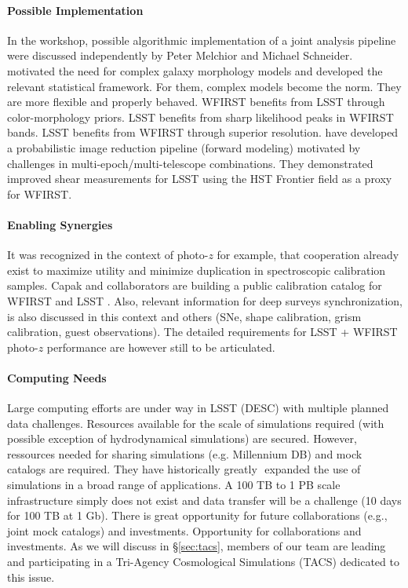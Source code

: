 \paragraph*{Possible Implementation} In the workshop, possible algorithmic
implementation of a joint analysis pipeline were discussed independently by
Peter Melchior and Michael Schneider. \citet{Melchior:2016asy} motivated the
need for complex galaxy morphology models and developed the relevant statistical
framework. For them, complex models become the norm. They are more flexible and properly
behaved. WFIRST benefits from LSST through color-morphology priors. LSST
benefits from sharp likelihood peaks in WFIRST bands. LSST benefits from WFIRST
through superior resolution. \citet{Schneider:2014rha} have developed a probabilistic
image reduction pipeline (forward modeling) motivated by challenges in
multi-epoch/multi-telescope combinations. They demonstrated improved shear
measurements for LSST using the HST Frontier field as a proxy for WFIRST.

\paragraph*{Enabling Synergies} It was recognized in the context of photo-$z$ for example, that
cooperation already exist to maximize utility and minimize duplication in
spectroscopic calibration samples. Capak and collaborators are building a public
calibration catalog for WFIRST and LSST \citep{Masters2017}. Also, relevant information for deep
surveys synchronization, is also discussed in this context and others (SNe,
shape calibration, grism calibration, guest observations). The detailed requirements for LSST + WFIRST photo-$z$ performance are however still to be articulated.

\paragraph*{Computing Needs} Large computing efforts are under way in LSST
(DESC) with multiple planned data challenges. Resources available for the scale
of simulations required (with possible exception of hydrodynamical simulations)
are secured. However, ressources needed for sharing simulations (e.g. Millennium
DB) and mock catalogs are required. They have historically greatly  expanded the
use of simulations in a broad range of applications. A 100 TB to 1 PB scale
infrastructure simply does not exist and data transfer will be a challenge (10
days for 100 TB at 1 Gb). There is great opportunity for future collaborations
(e.g., joint mock catalogs) and investments. Opportunity for collaborations and
investments. As we will discuss in \S\ref{sec:tacs}, members of our team are leading and participating in a Tri-Agency Cosmological Simulations (TACS) dedicated to this issue.

